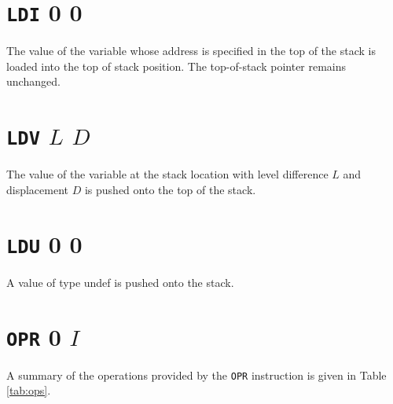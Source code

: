 \documentclass[a4paper,10pt]{report}
\begin{document}
\section{\texttt{LDI} 0 0}
The value of the variable whose address is specified in the top of the
stack is loaded into the top of stack position.  The top-of-stack
pointer remains unchanged.

\section{\texttt{LDV} $L$ $D$}
The value of the variable at the stack location with level difference
$L$ and displacement $D$ is pushed onto the top of the stack.

\section{\texttt{LDU} 0 0}
A value of type undef is pushed onto the stack.  

\section{\texttt{OPR} 0 $I$}
\label{sec:instr:OPR}
A summary of the operations provided by the \texttt{OPR} instruction is given in Table \ref{tab:ops}.
\end{document}
